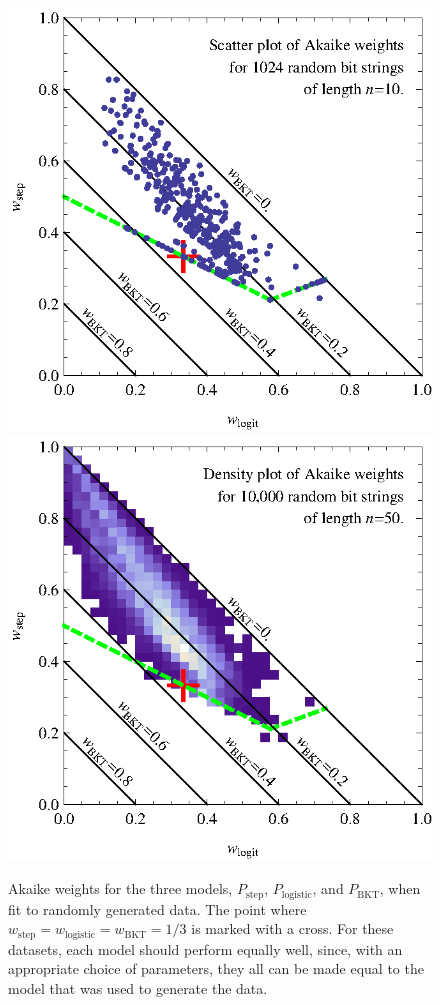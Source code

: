 \documentclass{edm_template}
\begin{document}
\begin{figure}
  \includegraphics{scatter10.eps}
  \includegraphics{density50.eps}
  \caption{Akaike weights for the three models, 
   $P_\mathrm{step}$, $P_\mathrm{logistic}$, and $P_\mathrm{BKT}$, 
   when fit to randomly generated data.  The point where
   $w_\mathrm{step}=w_\mathrm{logistic}=w_\mathrm{BKT}=1/3$ is
   marked with a cross.  For these datasets, each 
   model should perform equally well, since, with an appropriate
   choice of parameters, they all can be made equal to 
   the model that was used to generate the data.}\label{scatter2}
\end{figure}
\end{document}
